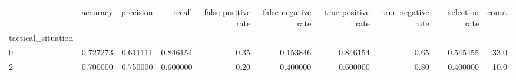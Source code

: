\begin{tabular}{lrrrrrrrrr}
\toprule
{} &  accuracy &  precision &    recall &  false positive rate &  false negative rate &  true positive rate &  true negative rate &  selection rate &  count \\
tactical\_situation &           &            &           &                      &                      &                     &                     &                 &        \\
\midrule
0                  &  0.727273 &   0.611111 &  0.846154 &                 0.35 &             0.153846 &            0.846154 &                0.65 &        0.545455 &   33.0 \\
2                  &  0.700000 &   0.750000 &  0.600000 &                 0.20 &             0.400000 &            0.600000 &                0.80 &        0.400000 &   10.0 \\
\bottomrule
\end{tabular}
